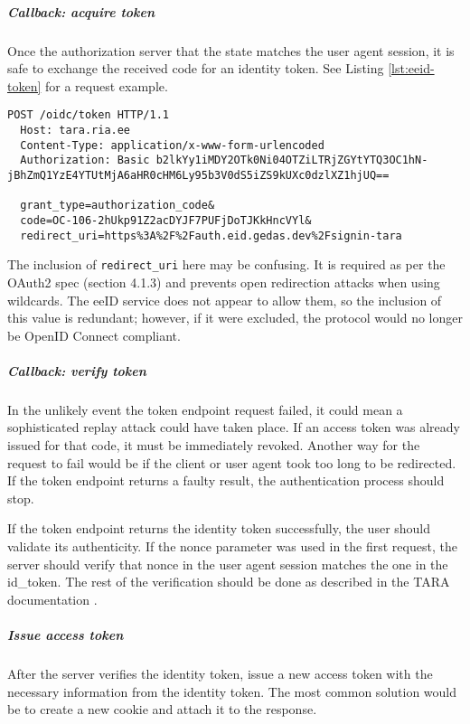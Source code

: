 \subparagraph{Callback: acquire token}

Once the authorization server that the state matches the user agent session, it is safe to exchange the received code for an identity token. See Listing \ref{lst:eeid-token} for a request example.

\begin{lstlisting}[caption={The eeID service token request}, label={lst:eeid-token}]
  POST /oidc/token HTTP/1.1
  Host: tara.ria.ee
  Content-Type: application/x-www-form-urlencoded
  Authorization: Basic b2lkYy1iMDY2OTk0Ni04OTZiLTRjZGYtYTQ3OC1hN-jBhZmQ1YzE4YTUtMjA6aHR0cHM6Ly95b3V0dS5iZS9kUXc0dzlXZ1hjUQ==

  grant_type=authorization_code&
  code=OC-106-2hUkp91Z2acDYJF7PUFjDoTJKkHncVYl&
  redirect_uri=https%3A%2F%2Fauth.eid.gedas.dev%2Fsignin-tara
\end{lstlisting}

The inclusion of \texttt{redirect\_uri} here may be confusing. It is required as per the OAuth2 spec (section 4.1.3) \cite{rfc6749} and prevents open redirection attacks when using wildcards. The eeID service does not appear to allow them, so the inclusion of this value is redundant; however, if it were excluded, the protocol would no longer be OpenID Connect compliant.

\subparagraph{Callback: verify token}

In the unlikely event the token endpoint request failed, it could mean a sophisticated replay attack could have taken place. If an access token was already issued for that code, it must be immediately revoked. Another way for the request to fail would be if the client or user agent took too long to be redirected. If the token endpoint returns a faulty result, the authentication process should stop.

If the token endpoint returns the identity token successfully, the user should validate its authenticity. If the nonce parameter was used in the first request, the server should verify that nonce in the user agent session matches the one in the id\_token. The rest of the verification should be done as described in the TARA documentation \cite{tara-technical}.

\subparagraph{Issue access token}

After the server verifies the identity token, issue a new access token with the necessary information from the identity token. The most common solution would be to create a new cookie and attach it to the response.

